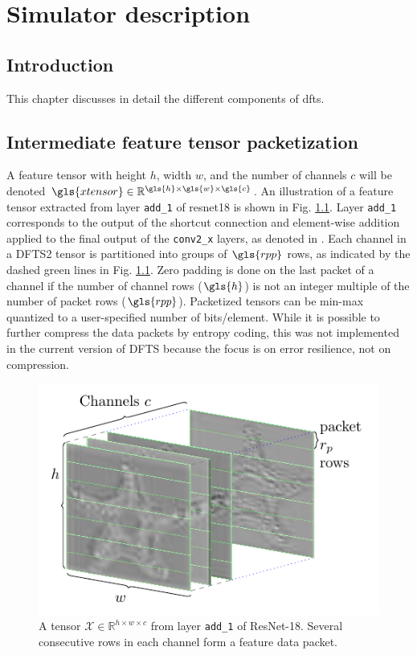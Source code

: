 \chapter{Simulator description}\label{chapt:simdescr}
\section{Introduction}
This chapter discusses in detail the different components of \gls{dfts}.

\section{Intermediate feature tensor packetization} \label{sec:simdescr:pkt}
A feature tensor with height $h$, width $w$, and the number of channels $c$ will be denoted $\gls{xtensor} \in \mathbb{R}^{\gls{h} \times \gls{w} \times \gls{c}}$. An illustration of a feature tensor extracted from layer \texttt{add\_1} of \gls{resnet18} \cite{ResNet} is shown in Fig. \ref{fig:simdescr:pkt:tensorviz}.
Layer \texttt{add\_1} corresponds to the output of the shortcut connection and element-wise addition applied to the final output of the \texttt{conv2\_x} layers, as denoted in \cite[Table 1]{ResNet}. Each channel in a DFTS2 tensor is partitioned into groups of $\gls{rpp}$ rows, as indicated by the dashed green lines in Fig. \ref{fig:simdescr:pkt:tensorviz}. Zero padding is done on the last packet of a channel if the number of channel rows ($\gls{h}$) is not an integer multiple of the number of packet rows ($\gls{rpp}$). Packetized tensors can be min-max quantized \cite{choi2018deep} to a user-specified number of bits/element. While it is possible to further compress the data packets by entropy coding, this was not implemented in the current version of DFTS  because the focus is on error resilience, not on compression.

\begin{figure}[H]
	\centering
	\includegraphics[scale=1]{Figures/tensorlostviz3icip.pdf}
	\caption[ResNet18 tensor visualization]{A tensor $\mathcal{X} \in \mathbb{R}^{h \times w \times c}$ from layer \texttt{add\_1} of ResNet-18. Several consecutive rows in each channel form a feature data packet.}
	\label{fig:simdescr:pkt:tensorviz}
\end{figure}

